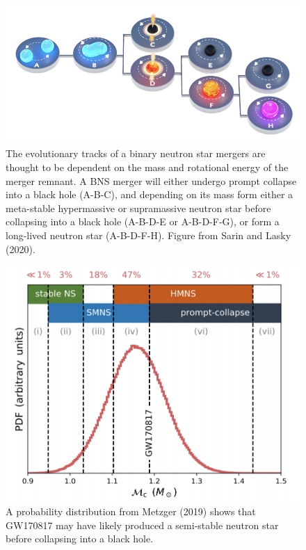 \documentclass[1.5,11pt]{beavtex}
\begin{document}
\begin{figure}[ht!]
  \centering
  \includegraphics[scale=0.50]{images/ch2/BNS-endpoints.png}
  \caption{\selectfont The evolutionary tracks of a binary neutron star mergers are thought to be dependent on the mass and rotational energy of the merger remnant. A BNS merger will either undergo prompt collapse into a black hole (A-B-C), and depending on its mass form either a meta-stable hypermassive or supramassive neutron star before collapsing into a black hole (A-B-D-E or A-B-D-F-G), or form a long-lived neutron star (A-B-D-F-H). Figure from Sarin and Lasky (2020).}
  \label{fig:BNS-endpoints}
\end{figure}

\begin{figure}[hb!]
  \centering
  \includegraphics[scale=0.40]{images/ch2/GW170817-endpoint-PDF.png}
  \caption{\selectfont A probability distribution from Metzger (2019) shows that GW170817 may have likely produced a semi-stable neutron star before collapsing into a black hole.}
  \label{fig:GW170817-endpoint}
\end{figure}
\pagebreak
\end{document}
